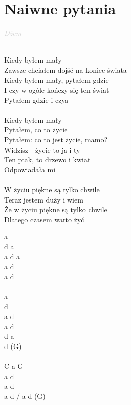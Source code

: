 \documentclass[a5paper, 10pt]{book}
\begin{document}
\section{Naiwne pytania}\textcolor{lightgray}{\textit{Dżem}}\\~\\
\begin{minipage}[t]{0.8\textwidth}
  Kiedy byłem mały\\
  Zawsze chciałem dojść na koniec świata\\
  Kiedy byłem mały, pytałem gdzie\\
  I czy w ogóle kończy się ten świat\\
  Pytałem gdzie i czya\\
  \\
  Kiedy byłem mały\\
  Pytałem, co to życie\\
  Pytałem: co to jest życie, mamo?\\
  Widzisz - życie to ja i ty\\
  Ten ptak, to drzewo i kwiat\\
  Odpowiadała mi\\
  \\
  \hspace*{5mm}W życiu piękne są tylko chwile\\

  Teraz jestem duży i wiem\\
  Że w życiu piękne są tylko chwile\\
  Dlatego czasem warto żyć\\
\end{minipage}
\begin{minipage}[t]{0.2\textwidth}
  a\\
  d a\\
  a d a\\
  a d\\
  a d\\
  \\
  a\\
  d\\
  a d\\
  a d\\
  d a\\
  d (G)\\
  \\
  C a G\\

  a d\\
  a d\\
  a d / a d (G)\\
\end{minipage}
\end{document}
